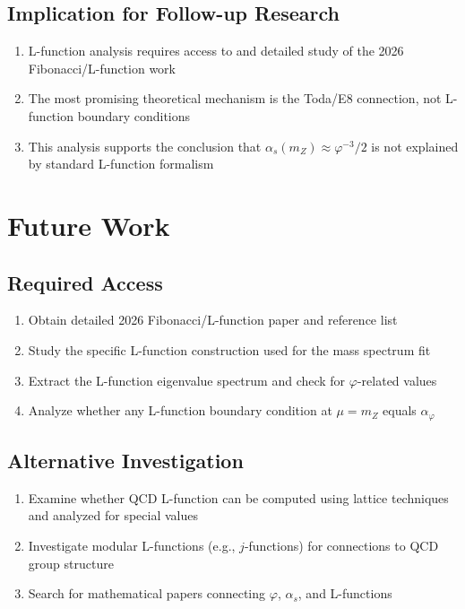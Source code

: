 \documentclass{article}
\begin{document}
\begin{table}[h]
\begin{table}[h]
\subsection{Implication for Follow-up Research}

\begin{enumerate}
  \item L-function analysis requires access to and detailed study of the 2026 Fibonacci/L-function work
  \item The most promising theoretical mechanism is the Toda/E8 connection, not L-function boundary conditions
  \item This analysis supports the conclusion that $\alpha_s(m_Z) \approx \varphi^{-3}/2$ is not explained by standard L-function formalism
\end{enumerate}

\section{Future Work}

\subsection{Required Access}

\begin{enumerate}
  \item Obtain detailed 2026 Fibonacci/L-function paper and reference list
  \item Study the specific L-function construction used for the mass spectrum fit
  \item Extract the L-function eigenvalue spectrum and check for $\varphi$-related values
  \item Analyze whether any L-function boundary condition at $\mu = m_Z$ equals $\alpha_\varphi$
\end{enumerate}

\subsection{Alternative Investigation}

\begin{enumerate}
  \item Examine whether QCD L-function can be computed using lattice techniques and analyzed for special values
  \item Investigate modular L-functions (e.g., $j$-functions) for connections to QCD group structure
  \item Search for mathematical papers connecting $\varphi$, $\alpha_s$, and L-functions
\end{enumerate}


\end{table}
\end{table}
\end{document}
